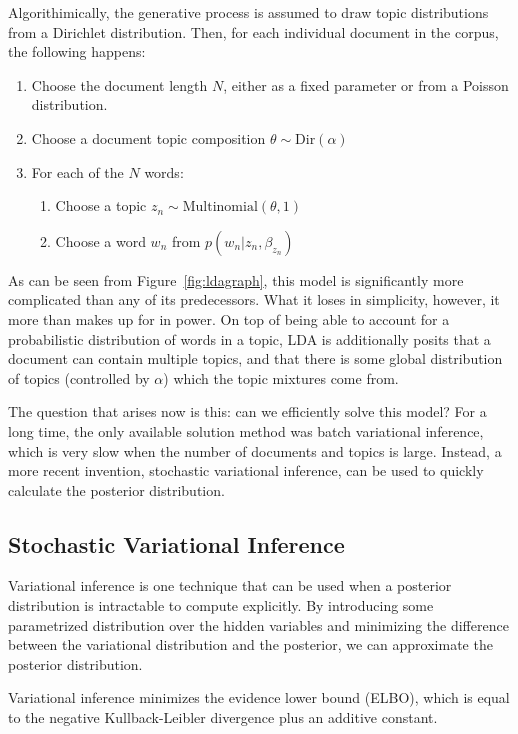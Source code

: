 \documentclass{article}
\begin{document}
Algorithimically, the generative process is assumed to draw topic distributions
from a Dirichlet distribution. Then, for each individual document in the corpus,
the following happens:

\begin{enumerate}
\item Choose the document length $N$, either as a fixed parameter or from a Poisson
  distribution.
\item Choose a document topic composition $\theta \sim \text{Dir}(\alpha)$
\item For each of the $N$ words:
  \begin{enumerate}
  \item Choose a topic $z_n \sim \text{Multinomial}(\theta, 1)$
  \item Choose a word $w_n$ from $p(w_n | z_n, \beta_{z_n})$
  \end{enumerate}
\end{enumerate}

As can be seen from Figure~\ref{fig:ldagraph}, this model is significantly more
complicated than any of its predecessors. What it loses in simplicity, however,
it more than makes up for in power. On top of being able to account for a
probabilistic distribution of words in a topic, LDA is additionally posits that
a document can contain multiple topics, and that there is some global
distribution of topics (controlled by $\alpha$) which the topic mixtures come
from.

The question that arises now is this: can we efficiently solve this model? For a
long time, the only available solution method was batch variational inference,
which is very slow when the number of documents and topics is large. Instead, a
more recent invention, stochastic variational inference, can be used to quickly
calculate the posterior distribution.

\subsection{Stochastic Variational Inference}

Variational inference is one technique that can be used when a posterior
distribution is intractable to compute explicitly. By introducing some
parametrized distribution over the hidden variables and minimizing the
difference between the variational distribution and the posterior, we can
approximate the posterior distribution.

Variational inference minimizes the evidence lower bound (ELBO), which is equal
to the negative Kullback-Leibler divergence plus an additive constant.
\end{document}
